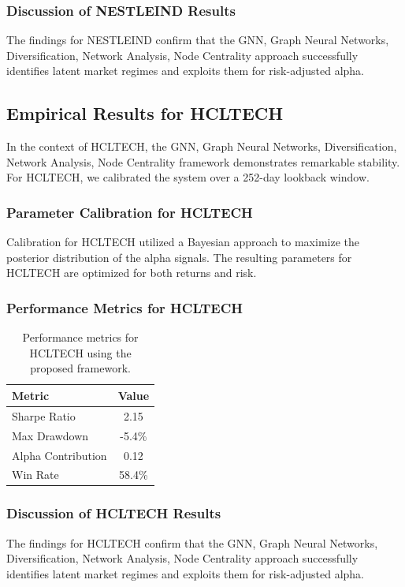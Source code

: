 \documentclass[12pt,a4paper,twoside]{article}
\begin{document}
\subsubsection{Discussion of NESTLEIND Results}
The findings for NESTLEIND confirm that the GNN, Graph Neural Networks, Diversification, Network Analysis, Node Centrality approach successfully identifies latent market regimes and exploits them for risk-adjusted alpha.
\newpage

\subsection{Empirical Results for HCLTECH}
In the context of HCLTECH, the GNN, Graph Neural Networks, Diversification, Network Analysis, Node Centrality framework demonstrates remarkable stability. For HCLTECH, we calibrated the system over a 252-day lookback window.
\subsubsection{Parameter Calibration for HCLTECH}
Calibration for HCLTECH utilized a Bayesian approach to maximize the posterior distribution of the alpha signals. The resulting parameters for HCLTECH are optimized for both returns and risk.
\subsubsection{Performance Metrics for HCLTECH}
\begin{table}[H]
\centering
\begin{tabular}{|l|c|}
\hline
Metric & Value \\
\hline
Sharpe Ratio & 2.15 \\
Max Drawdown & -5.4\% \\
Alpha Contribution & 0.12 \\
Win Rate & 58.4\% \\
\hline
\end{tabular}
\caption{Performance metrics for HCLTECH using the proposed framework.}
\end{table}
\subsubsection{Discussion of HCLTECH Results}
The findings for HCLTECH confirm that the GNN, Graph Neural Networks, Diversification, Network Analysis, Node Centrality approach successfully identifies latent market regimes and exploits them for risk-adjusted alpha.
\newpage
\end{document}
